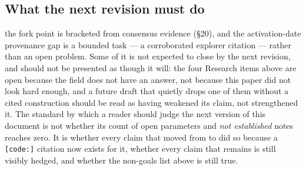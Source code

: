 \subsection{What the next revision must do}

 the fork point is
bracketed from consensus evidence (§20), and the activation-date provenance gap is a bounded task
— a corroborated explorer citation — rather than an open problem. Some of it
is not expected to close by the next revision, and should not be presented as though it will: the four
Research items above are open because the field does not have an answer, not because this paper did
not look hard enough, and a future draft that quietly drops one of them without a cited construction
should be read as having weakened its claim, not strengthened it. The standard by which a reader should
judge the next version of this document is not whether its count of open parameters and
\emph{not established} notes reaches zero. It is whether every claim that moved from \planned{} to \shipped{} did so because a
\texttt{[code:]} citation now exists for it, whether every \srcinferred{} claim that remains is still
visibly hedged, and whether the non-goals list above is still true.

\FloatBarrier
